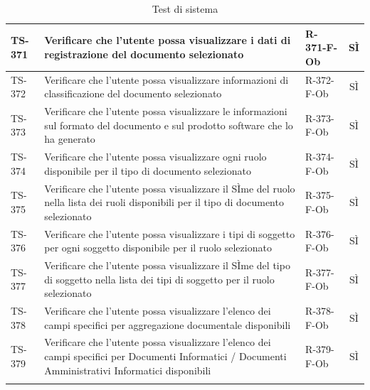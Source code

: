 \documentclass[a4paper,12pt]{article}
\begin{document}
\begin{longtable}{|p{1.5cm}|p{8.3cm}|p{2.4cm}|c|}
\hline
TS-371 & Verificare che l'utente possa visualizzare i dati di registrazione del documento selezionato & R-371-F-Ob & SÌ \\
\hline
TS-372 & Verificare che l'utente possa visualizzare informazioni di classificazione del documento selezionato & R-372-F-Ob & SÌ \\
\hline
TS-373 & Verificare che l'utente possa visualizzare le informazioni sul formato del documento e sul prodotto software che lo ha generato & R-373-F-Ob & SÌ \\
\hline
TS-374 & Verificare che l'utente possa visualizzare ogni ruolo disponibile per il tipo di documento selezionato & R-374-F-Ob & SÌ \\
\hline
TS-375 & Verificare che l'utente possa visualizzare il SÌme del ruolo nella lista dei ruoli disponibili per il tipo di documento selezionato & R-375-F-Ob & SÌ \\
\hline
TS-376 & Verificare che l'utente possa visualizzare i tipi di soggetto per ogni soggetto disponibile per il ruolo selezionato & R-376-F-Ob & SÌ \\
\hline
TS-377 & Verificare che l'utente possa visualizzare il SÌme del tipo di soggetto nella lista dei tipi di soggetto per il ruolo selezionato & R-377-F-Ob & SÌ \\
\hline
TS-378 & Verificare che l'utente possa visualizzare l'elenco dei campi specifici per aggregazione documentale disponibili & R-378-F-Ob & SÌ \\
\hline
TS-379 & Verificare che l'utente possa visualizzare l'elenco dei campi specifici per Documenti Informatici / Documenti Amministrativi Informatici disponibili & R-379-F-Ob & SÌ \\
\hline
\rowcolor{white}
\caption{Test di sistema}
\label{tab:test-sistema}
\end{longtable}
\end{document}
